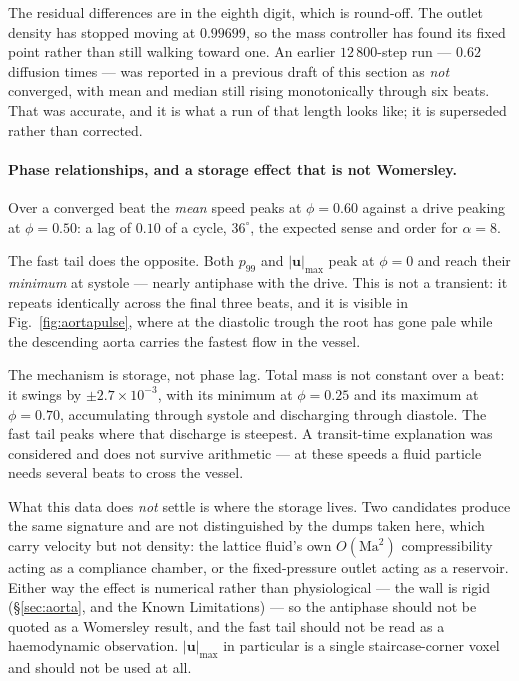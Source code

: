\documentclass[11pt,a4paper]{article}
\newcommand{\uu}{\bm{u}}
\newcommand{\e}[1]{\times 10^{#1}}
\begin{document}
\noindent The residual differences are in the eighth digit, which is round-off.
The outlet density has stopped moving at $0.99699$, so the mass controller has
found its fixed point rather than still walking toward one. An earlier
$12\,800$-step run --- $0.62$ diffusion times --- was reported in a previous
draft of this section as \emph{not} converged, with mean and median still rising
monotonically through six beats. That was accurate, and it is what a run of that
length looks like; it is superseded rather than corrected.

\paragraph{Phase relationships, and a storage effect that is not Womersley.}
Over a converged beat the \emph{mean} speed peaks at $\phi=0.60$ against a drive
peaking at $\phi=0.50$: a lag of $0.10$ of a cycle, $36^\circ$, the expected
sense and order for $\alpha=8$.

The fast tail does the opposite. Both $p_{99}$ and $|\uu|_{\max}$ peak at
$\phi=0$ and reach their \emph{minimum} at systole --- nearly antiphase with the
drive. This is not a transient: it repeats identically across the final three
beats, and it is visible in Fig.~\ref{fig:aortapulse}, where at the diastolic
trough the root has gone pale while the descending aorta carries the fastest
flow in the vessel.

The mechanism is storage, not phase lag. Total mass is not constant over a beat:
it swings by $\pm2.7\e{-3}$, with its minimum at $\phi=0.25$ and its maximum at
$\phi=0.70$, accumulating through systole and discharging through diastole. The
fast tail peaks where that discharge is steepest. A transit-time explanation was
considered and does not survive arithmetic --- at these speeds a fluid particle
needs several beats to cross the vessel.

What this data does \emph{not} settle is where the storage lives. Two candidates
produce the same signature and are not distinguished by the dumps taken here,
which carry velocity but not density: the lattice fluid's own $O(\mathrm{Ma}^2)$
compressibility acting as a compliance chamber, or the fixed-pressure outlet
acting as a reservoir. Either way the effect is numerical rather than
physiological --- the wall is rigid (\S\ref{sec:aorta}, and the Known
Limitations) --- so the antiphase should not be quoted as a Womersley result,
and the fast tail should not be read as a haemodynamic observation.
$|\uu|_{\max}$ in particular is a single staircase-corner voxel and should not
be used at all.
\end{document}
